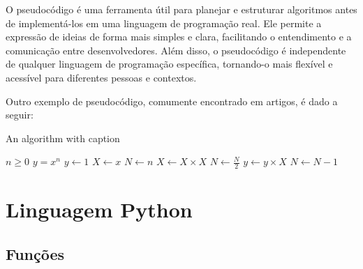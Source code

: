\documentclass[a4paper, 12pt, onecolumn,singlespacing]{article}
\begin{document}
	O pseudocódigo é uma ferramenta útil para planejar e estruturar algoritmos antes de implementá-los em uma linguagem de programação real. Ele permite a expressão de ideias de forma mais simples e clara, facilitando o entendimento e a comunicação entre desenvolvedores. Além disso, o pseudocódigo é independente de qualquer linguagem de programação específica, tornando-o mais flexível e acessível para diferentes pessoas e contextos.
	
	Outro exemplo de pseudocódigo, comumente encontrado em artigos, é dado a seguir:
		
	\begin{algorithm}
		\caption{An algorithm with caption}\label{alg:cap}
		\begin{algorithmic}
			\Require $n \geq 0$
			\Ensure $y = x^n$
			\State $y \gets 1$
			\State $X \gets x$
			\State $N \gets n$
			\State $X \gets X \times X$
			\State $N \gets \frac{N}{2}$  
			\State $y \gets y \times X$
			\State $N \gets N - 1$
			\EndIf
			\EndWhile
		\end{algorithmic}
	\end{algorithm}
	
	
	\section{Linguagem Python}
	
	\subsection{Funções}
	
\end{document}
